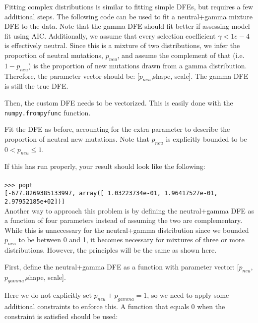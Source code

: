 \documentclass[11pt]{article}
\begin{document}
Fitting complex distributions is similar to fitting simple DFEs, but requires a few additional steps. The following code can be used to fit a neutral+gamma mixture DFE to the data. Note that the gamma DFE should fit better if assessing model fit using AIC. Additionally, we assume that every selection coefficient $\gamma < 1e-4$ is effectively neutral. Since this is a mixture of two distributions, we infer the proportion of neutral mutations, $p_{neu}$, and assume the complement of that (i.e. $1-p_{neu}$) is the proportion of new mutations drawn from a gamma distribution. Therefore, the parameter vector should be: [$p_{neu}$,shape, scale]. The gamma DFE is still the true DFE.



Then, the custom DFE needs to be vectorized. This is easily done with the \texttt{numpy.frompyfunc} function.



Fit the DFE as before, accounting for the extra parameter to describe the proportion of neutral new mutations. Note that $p_{neu}$ is explicitly bounded to be $0 < p_{neu} \leq 1$.



If this has run properly, your result should look like the following: \\ \\
\texttt{>>> popt} \\
\texttt{[-677.8269385133997, array([  1.03223734e-01,   1.96417527e-01,   2.97952185e+02])]} \\

Another way to approach this problem is by defining the neutral+gamma DFE as a function of four parameters instead of assuming the two are complementary. While this is unnecessary for the neutral+gamma distribution since we bounded $p_{neu}$ to be between 0 and 1, it becomes necessary for mixtures of three or more distributions. However, the principles will be the same as shown here. 

First, define the neutral+gamma DFE as a function with parameter vector: [$p_{neu}$,$p_{gamma}$,shape, scale]. 



Here we do not explicitly set $p_{neu} + p_{gamma} = 1$, so we need to apply some additional constraints to enforce this. A function that equals 0 when the constraint is satisfied should be used:
\end{document}
